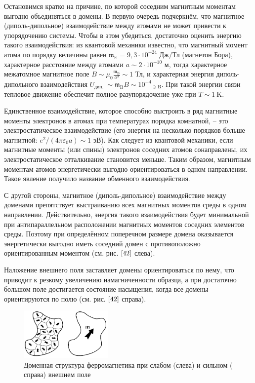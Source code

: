 \documentclass[a4paper,14pt]{article} %
\begin{document}
Остановимся кратко на причине, по которой соседним магнитным моментам выгодно объединяться в домены. В первую очередь подчеркнём, что $\textbf{магнитное}$ (диполь-дипольное) взаимодействие между атомами $\textbf{не может}$ привести к упорядочению системы. Чтобы в этом убедиться, достаточно оценить энергию такого взаимодействия: из квантовой механики известно, что магнитный момент атома по порядку величины равен $\mathfrak{m}_{\mathrm{E}}=9,3 \cdot 10^{-24}$ Дж/Тл (магнетон Бора), характерное расстояние между атомами $a \sim 2 \cdot 10^{-10}$ м, тогда характерное межатомное магнитное поле $B \sim \mu_{0} \frac{\mathfrak{m}_{\mathrm{B}}}{a^{3}} \sim 1$ Тл, и характерная энергия диполь-дипольного взаимодействия $U_{\text {дип. }} \sim \mathfrak{m}_{\mathrm{B}} B \sim 10^{-4}{ }_{\ni \mathrm{B}}$. При такой энергии связи тепловое движение обеспечит полное разупорядочение уже при $T \sim 1 \mathrm{~K}$.

Единственное взаимодействие, которое способно выстроить в ряд магнитные моменты электронов в атомах при температурах порядка комнатной, -- это $\textbf{электростатическое взаимодействие}$ (его энергия на несколько порядков больше магнитной: $e^{2} /\left(4 \pi \varepsilon_{0} a\right) \sim 1$ эВ). Как следует из квантовой механики, если магнитные моменты (или спины) электронов соседних атомов сонаправлены, их электростатическое отталкивание становится меньше. Таким образом, магнитным моментам атомов энергетически выгодно ориентироваться в одном направлении. Такое явление получило название $\textbf{обменного}$ $\textbf{взаимодействия}$.

С другой стороны, магнитное (диполь-дипольное) взаимодействие между доменами препятствует выстраиванию всех магнитных моментов среды в одном направлении. Действительно, энергия такого взаимодействия будет минимальной при  $\textbf{антипараллельном}$ расположении магнитных моментов соседних элементов среды. Поэтому при определённом поперечном размере домена оказывается энергетически выгодно иметь соседний домен с противоположно ориентированным моментом (см. рис. $\ref{42}$ слева).

Наложение внешнего поля заставляет домены ориентироваться по нему, что приводит к резкому увеличению намагниченности образца, а при достаточно большом поле достигается состояние $\textbf{насыщения}$, когда все домены ориентируются по полю (см. рис. $\ref{42}$ справа).

\begin{figure}[h!]

\begin{center}
\includegraphics[width=0.4\textwidth]{4.2.png} 
\end{center}
\caption{Доменная структура ферромагнетика при слабом ($\textbf{слева}$) и сильном ($\textbf{справа}$) внешнем поле}
\label{42}
\end{figure}
\end{document}

